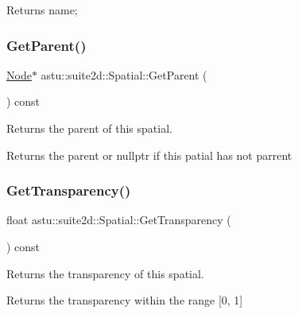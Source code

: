 \begin{DoxyReturn}{Returns}
name; 
\end{DoxyReturn}
\mbox{\label{classastu_1_1suite2d_1_1Spatial_ad16fc3b6a6f31a15606953499de058bc}} 
\subsubsection{\texorpdfstring{Get\+Parent()}{GetParent()}}
{\footnotesize\ttfamily \hyperlink{classastu_1_1suite2d_1_1Node}{Node}$\ast$ astu\+::suite2d\+::\+Spatial\+::\+Get\+Parent (\begin{DoxyParamCaption}{ }\end{DoxyParamCaption}) const\hspace{0.3cm}{\ttfamily [inline]}}

Returns the parent of this spatial.

\begin{DoxyReturn}{Returns}
the parent or nullptr if this patial has not parrent 
\end{DoxyReturn}
\mbox{\label{classastu_1_1suite2d_1_1Spatial_ac7face6d319542d0b9061b0d26c3bc2d}} 
\subsubsection{\texorpdfstring{Get\+Transparency()}{GetTransparency()}}
{\footnotesize\ttfamily float astu\+::suite2d\+::\+Spatial\+::\+Get\+Transparency (\begin{DoxyParamCaption}{ }\end{DoxyParamCaption}) const\hspace{0.3cm}{\ttfamily [inline]}}

Returns the transparency of this spatial.

\begin{DoxyReturn}{Returns}
the transparency within the range \mbox{[}0, 1\mbox{]} 
\end{DoxyReturn}
\mbox{\label{classastu_1_1suite2d_1_1Spatial_a4dbd0d78ad2b6921c9b4067e7ce07465}} 
